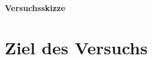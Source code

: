 \documentclass[11pt, A4paper]{article}
\begin{document}
\maketitle
\paragraph{Versuchsskizze}

\newpage
\section{Ziel des Versuchs}
\end{document}
